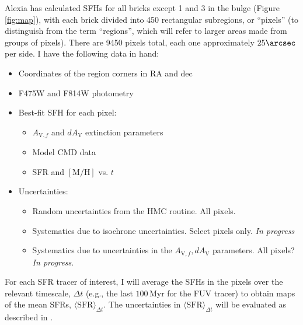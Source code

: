 \documentclass[preprint,11pt]{aastex}
\begin{document}
Alexia has calculated SFHs for all bricks except 1 and 3 in the bulge (Figure
\ref{fig:map}), with each brick divided into 450 rectangular subregions, or
``pixels'' (to distinguish from the term ``regions'', which will refer to
larger areas made from groups of pixels). There are 9450 pixels total, each one
approximately $25\arcsec$ per side. I have the following data in hand:
\begin{itemize}
\item Coordinates of the region corners in RA and dec
\item F475W and F814W photometry
\item Best-fit SFH for each pixel:

    \begin{itemize}
    \item $A_{\mathrm{V},f}$ and $dA_\mathrm{V}$ extinction parameters
    \item Model CMD data
    \item SFR and $\mathrm{[M/H]}$ vs. $t$
    \end{itemize}

\item Uncertainties:

    \begin{itemize}
    \item Random uncertainties from the HMC routine. All pixels.
    \item Systematics due to isochrone uncertainties. Select pixels only.
        \emph{In progress}
    \item Systematics due to uncertainties in the
        $A_{\mathrm{V},f},dA_\mathrm{V}$ parameters. All pixels? \emph{In
        progress}.
    \end{itemize}

\end{itemize}

For each SFR tracer of interest, I will average the SFHs in the pixels over the
relevant timescale, $\Delta t$ (e.g., the last $100\,\mathrm{Myr}$ for the FUV
tracer) to obtain maps of the mean SFRs, $\langle \mathrm{SFR}\rangle_{\Delta
t}$. The uncertainties in $\langle \mathrm{SFR}\rangle_{\Delta t}$ will be
evaluated as described in \citet{Simones14}.
\end{document}
